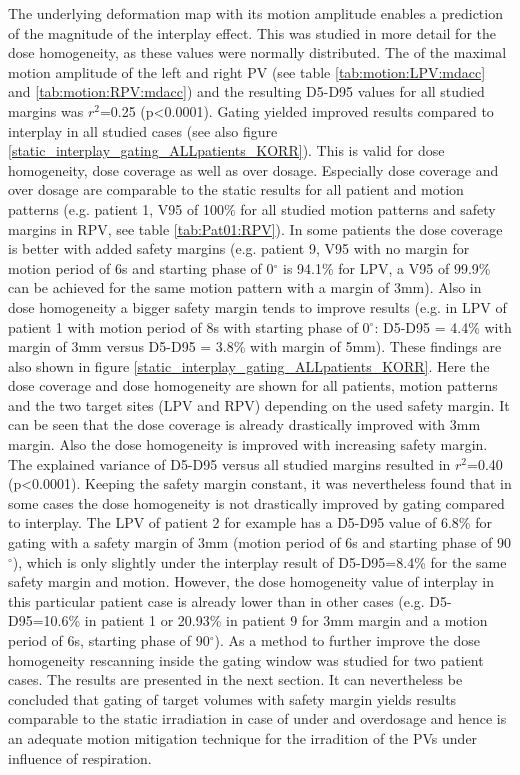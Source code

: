 \documentclass[type=dr, dr=rernat, accentcolor=tud7b,colorbacktitle, bigchapter, openright, twoside, 12pt ]{tudthesis}
\begin{document}
The underlying deformation map with its motion amplitude enables a prediction of the magnitude of the interplay effect. 
This was studied in more detail for the dose homogeneity, as these values were normally distributed. 
The of the maximal motion amplitude of the left and right PV (see table \ref{tab:motion:LPV:mdacc} and 
\ref{tab:motion:RPV:mdacc}) and the resulting D5-D95 values for all studied margins was $r^{2}$=0.25 (p<0.0001).\newline 
\newline
Gating yielded improved results compared to interplay in all studied cases (see also figure \ref{static_interplay_gating_ALLpatients_KORR}). 
This is valid for dose homogeneity, dose coverage as 
well as over dosage. Especially dose coverage and over dosage are comparable to the static results for all patient and motion patterns 
(e.g. patient 1, V95 of 100\% for all studied motion patterns and safety margins in RPV, see table \ref{tab:Pat01:RPV}). In some patients the 
dose coverage is better with added safety margins (e.g. patient 9, V95 with no margin for motion period of 6s and starting phase of 0$^{\circ}$ is 94.1\% for LPV, 
a V95 of 99.9\% can be achieved for the same motion pattern with a margin of 3mm). Also in dose homogeneity a bigger safety margin tends to 
improve results (e.g. in LPV of patient 1 with motion period of 8s with starting phase of 0$^{\circ}$: D5-D95 = 4.4\% with margin of 3mm 
versus D5-D95 = 3.8\% with margin of 5mm). These findings are also shown in figure \ref{static_interplay_gating_ALLpatients_KORR}. Here 
the dose coverage and dose homogeneity are shown for all patients, motion patterns and the two target sites (LPV and RPV) depending on the 
used safety margin. It can be seen that the dose coverage is already drastically improved with 3mm margin. Also the dose homogeneity is 
improved with increasing safety margin. 
The explained variance of D5-D95 versus all studied margins resulted in $r^{2}$=0.40 (p<0.0001). 
Keeping the safety margin constant, it was nevertheless found that in some cases 
the dose homogeneity is not drastically improved by gating compared to interplay. The LPV of patient 2 for example 
has a D5-D95 value of 6.8\% for gating with a safety margin of 3mm (motion period of 6s and starting phase of 90$^{\circ}$), which is 
only slightly under the interplay result of D5-D95=8.4\% for the same safety margin and motion. However, the dose homogeneity value of 
interplay in this particular patient case is already lower than in other cases (e.g. D5-D95=10.6\% in patient 1 or 20.93\% in patient 9 
for 3mm margin and a motion period of 6s, starting phase of 90$^{\circ}$).\newline
\newline
As a method to further improve the dose homogeneity rescanning inside the gating window was studied for two patient cases. The results are 
presented in the next section. It can nevertheless be concluded that gating of target volumes with safety margin yields results comparable to 
the static irradiation in case of under and overdosage and hence is an adequate motion mitigation technique for the irradition of the 
PVs under influence of respiration. 
\end{document}

